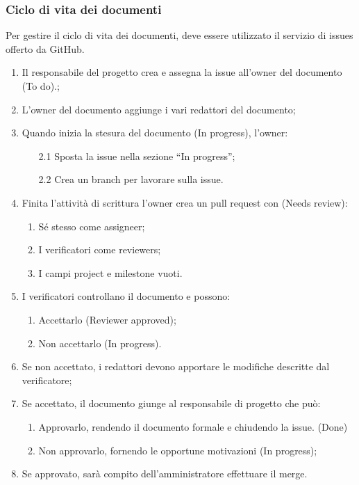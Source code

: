 \subsubsection{Ciclo di vita dei documenti}
Per gestire il ciclo di vita dei documenti, deve essere utilizzato il servizio di issues offerto da GitHub.
\begin{enumerate}
\item Il responsabile del progetto crea e assegna la issue all'owner del documento (To do).;
\item L'owner del documento aggiunge i vari redattori del documento;
\item Quando inizia la stesura del documento (In progress), l'owner:
	\begin{enumerate}
		\item[2.1] Sposta la issue nella sezione “In progress”;
		\item[2.2] Crea un branch per lavorare sulla issue.
	\end{enumerate}
\item Finita l'attività di scrittura l'owner crea un {pull request} con (Needs review):
	\begin{enumerate}
		\item Sé stesso come assigneer;
		\item I verificatori come reviewers;
		\item I campi project e milestone vuoti.
	\end{enumerate} 
\item I verificatori controllano il documento e possono:
	\begin{enumerate}
	 	\item Accettarlo (Reviewer approved);
	 	\item Non accettarlo (In progress).
	\end{enumerate}
\item Se non accettato, i redattori devono apportare le modifiche descritte dal verificatore;
\item Se accettato, il documento giunge al responsabile di progetto che può:
\begin{enumerate}
	\item Approvarlo, rendendo il documento formale e chiudendo la issue. (Done)
	\item Non approvarlo, fornendo le opportune motivazioni (In progress);
\end{enumerate}
\item Se approvato, sarà compito dell'amministratore effettuare il merge.
\end{enumerate}
